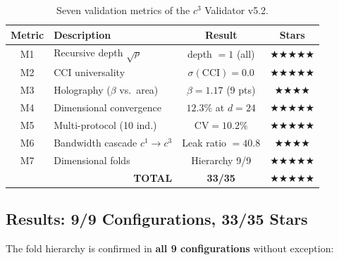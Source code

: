 \documentclass[12pt,a4paper,twoside]{article}
\begin{document}
\begin{table}[H]
\centering
\caption{Seven validation metrics of the $c^3$ Validator v5.2.}
\label{tab:c3_metrics}
\small
\begin{tabular}{clcc}
\toprule
\textbf{Metric} & \textbf{Description} & \textbf{Result} & \textbf{Stars} \\
\midrule
M1 & Recursive depth $\sqrt{\rho}$ & depth $= 1$ (all) & $\bigstar\bigstar\bigstar\bigstar\bigstar$ \\
M2 & CCI universality & $\sigma(\text{CCI}) = 0.0$ & $\bigstar\bigstar\bigstar\bigstar\bigstar$ \\
M3 & Holography ($\beta$ vs.\ area) & $\beta = 1.17$ (9 pts) & $\bigstar\bigstar\bigstar\bigstar$ \\
M4 & Dimensional convergence & $12.3\%$ at $d = 24$ & $\bigstar\bigstar\bigstar\bigstar\bigstar$ \\
M5 & Multi-protocol (10 ind.) & $\text{CV} = 10.2\%$ & $\bigstar\bigstar\bigstar\bigstar\bigstar$ \\
M6 & Bandwidth cascade $c^1{\to}c^3$ & Leak ratio $= 40.8$ & $\bigstar\bigstar\bigstar\bigstar$ \\
M7 & Dimensional folds & Hierarchy 9/9 & $\bigstar\bigstar\bigstar\bigstar\bigstar$ \\
\midrule
\multicolumn{2}{r}{\textbf{TOTAL}} & \textbf{33/35} & $\bigstar\bigstar\bigstar\bigstar\bigstar$ \\
\bottomrule
\end{tabular}
\end{table}

\subsection{Results: 9/9 Configurations, 33/35 Stars}

The fold hierarchy is confirmed in \textbf{all 9 configurations} without exception:
\end{document}
